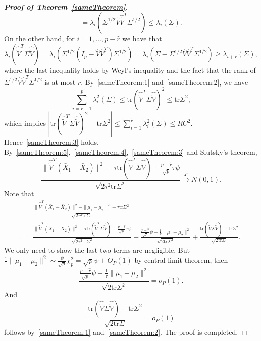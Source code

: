 \documentclass[review]{elsarticle}
\theoremstyle{plain}
\theoremstyle{definition}
\theoremstyle{remark}
\begin{document}
\begin{proof}[\textbf{Proof of Theorem~\ref{sameTheorem}}]
\begin{equation}
    =
    \lambda_i (\Sigma^{1/2} \hat{\tilde{V}}\hat{\tilde{V}}^T \Sigma^{1/2})
    \leq
    \lambda_i (\Sigma).
    \end{equation}
    On the other hand, for $i=1,\ldots,p-\hat{r}$ we have that
    \begin{equation}\label{sameTheorem:2}
    \lambda_i (\hat{\tilde{V}}^T \Sigma \hat{\tilde{V}})
    =
    \lambda_i (\Sigma^{1/2} (I_p-\hat{V}\hat{V}^T )\Sigma^{1/2})
    =
    \lambda_i (\Sigma-\Sigma^{1/2}\hat{V}\hat{V}^T\Sigma^{1/2})
    \geq
    \lambda_{i+\hat{r}} (\Sigma),
    \end{equation}
    where the last inequality holds by Weyl's inequality and the fact that the rank of $\Sigma^{1/2}\hat{V}\hat{V}^T\Sigma^{1/2}$ is at most $\hat{r}$.
    By~\eqref{sameTheorem:1} and~\eqref{sameTheorem:2}, we have
$$
    \sum_{i=\hat{r}+1}^p \lambda_{i}^2(\Sigma)\leq \mathrm{tr}(\hat{\tilde{V}}^T\Sigma\hat{\tilde{V}})^2\leq \mathrm{tr}\Sigma^2,
    $$
    which implies
    $
     |\mathrm{tr}(\hat{\tilde{V}}^T\Sigma\hat{\tilde{V}})^2- \mathrm{tr}\Sigma^2|\leq \sum_{i=1}^{\hat{r}} \lambda_{i}^2(\Sigma)\leq RC^2
    $.
    Hence~\eqref{sameTheorem:3} holds.
    By~\eqref{sameTheorem:5},~\eqref{sameTheorem:4},~\eqref{sameTheorem:3} and Slutsky's theorem, 
    \begin{equation*}
        \frac{\|\hat{\tilde{V}}^T(\bar{X}_1-\bar{X}_2)\|^2-\tau\mathrm{tr}(\hat{\tilde{V}}^T\Sigma\hat{\tilde{V}})-\frac{p-\hat{r}}{\sqrt{p}}\tau \psi }{\sqrt{2\tau^2\mathrm{tr}\Sigma^2}}\xrightarrow{\mathcal{L}}N(0,1).
    \end{equation*}
    Note that
    \begin{equation*}
        \begin{aligned}
            &\frac{\|\hat{\tilde{V}}^T(\bar{X}_1-\bar{X}_2)\|^2-\|\mu_1-\mu_2\|^2-\tau \mathrm{tr}\Sigma^2}{\sqrt{2\tau^2 \mathrm{tr}\Sigma}}\\
            =&
        \frac{\|\hat{\tilde{V}}^T(\bar{X}_1-\bar{X}_2)\|^2-\tau\mathrm{tr}(\hat{\tilde{V}}^T\Sigma\hat{\tilde{V}})-\frac{p-\hat{r}}{\sqrt{p}}\tau \psi }{\sqrt{2\tau^2\mathrm{tr}\Sigma^2}}
           + 
            \frac{\frac{p-\hat{r}}{\sqrt{p}}\psi-\frac{1}{\tau}\|\mu_1-\mu_2\|^2}{\sqrt{2\mathrm{tr}\Sigma^2}}
            +
            \frac{\mathrm{tr}(\hat{\tilde{V}}\Sigma\hat{\tilde{V}})-\mathrm{tr}\Sigma^2}{\sqrt{2\mathrm{tr}\Sigma}}.
        \end{aligned}
    \end{equation*}
We only need to show the last two terms are negligible.
But $\frac{1}{\tau}\|\mu_1-\mu_2\|^2\sim \frac{\psi}{\sqrt{p}}\chi^2_p=\sqrt{p}\psi+O_P(1)$ by central limit theorem, then
$$
            \frac{\frac{p-\hat{r}}{\sqrt{p}}\psi-\frac{1}{\tau}\|\mu_1-\mu_2\|^2}{\sqrt{2\mathrm{tr}\Sigma^2}}=o_P(1).
$$
And 
            $$
            \frac{\mathrm{tr}(\hat{\tilde{V}}\Sigma\hat{\tilde{V}})-\mathrm{tr}\Sigma^2}{\sqrt{2\mathrm{tr}\Sigma}}=o_P(1)
            $$
            follows by~\eqref{sameTheorem:1} and~\eqref{sameTheorem:2}. The proof is completed.
\end{proof}
\end{document}
